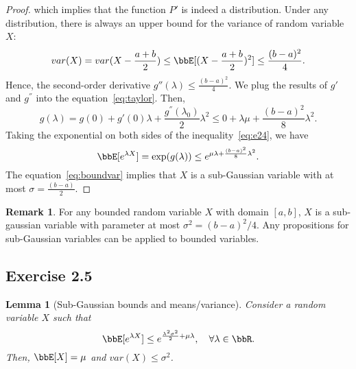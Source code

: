 \documentclass[11pt]{article}
\theoremstyle{plain}
\newtheorem{lem}{Lemma}
\theoremstyle{definition}
\newtheorem{rmk}{Remark}
\begin{document}
\begin{proof}
which implies that the function $P'$ is indeed a distribution. Under any distribution, there is always an upper bound for the variance of random variable $X$:
\[ var(X) = var(X - \frac{a+b}{2}) \leq \bbE[(X - \frac{a+b}{2} )^2] \leq \frac{(b-a)^2}{4}. \]
Hence, the second-order derivative $g''(\lambda) \leq \frac{(b-a)^2}{4}$. We plug the results of $g'$ and $g^{''}$ into the equation~\eqref{eq:taylor}. Then,
\begin{equation}\label{eq:e24}
	g(\lambda) =  g(0) + g'(0) \lambda  + \frac{g^{''}(\lambda_0) }{2} \lambda^2 \leq 0 + \lambda \mu+ \frac{(b-a)^2}{8} \lambda^2. 
\end{equation}
Taking the exponential on both sides of the inequality~\eqref{eq:e24}, we have
\begin{equation}\label{eq:boundvar}
	\bbE[e^{\lambda X}] = \exp(g( \lambda)) \leq e^{\mu \lambda + \frac{(b-a)^2}{8} \lambda^2}.
\end{equation}
The equation~\eqref{eq:boundvar} implies that $X$ is a sub-Gaussian variable with at most $\sigma = \frac{(b-a)}{2}$.
\end{proof}

\begin{rmk}
	For any bounded random variable $X$ with domain $[a,b]$, $X$ is a sub-gaussian variable with parameter at most $\sigma^2 = (b-a)^2/4$. Any propositions for sub-Gaussian variables can be applied to bounded variables. 
\end{rmk}


\subsection{Exercise 2.5}
\begin{lem}[Sub-Gaussian bounds and means/variance] Consider a random variable $X$ such that
\begin{equation}\label{eq:subg}
	 \bbE[e^{\lambda X}] \leq e^{\frac{\lambda^2 \sigma^2}{2} + \mu \lambda}, \quad \forall \lambda \in \bbR. 
\end{equation}
	Then, $\bbE[X] = \mu$ and $var(X) \leq \sigma^2$.
\end{lem}
\end{document}
